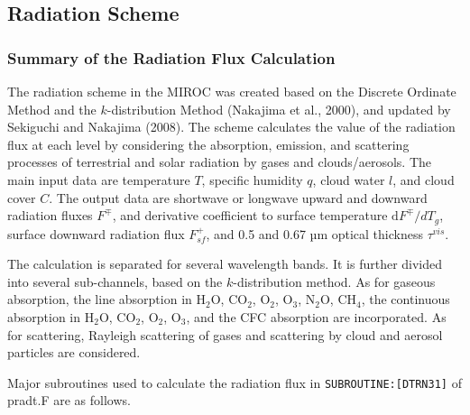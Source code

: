 \hypertarget{radiation-scheme}{%
\subsection{Radiation Scheme}\label{radiation-scheme}}

\hypertarget{summary-of-the-radiation-flux-calculation}{%
\subsubsection{Summary of the Radiation Flux
Calculation}\label{summary-of-the-radiation-flux-calculation}}

The radiation scheme in the MIROC was created based on the Discrete
Ordinate Method and the \(k\)-distribution Method (Nakajima et al.,
2000), and updated by Sekiguchi and Nakajima (2008). The scheme
calculates the value of the radiation flux at each level by considering
the absorption, emission, and scattering processes of terrestrial and
solar radiation by gases and clouds/aerosols. The main input data are
temperature \(T\), specific humidity \(q\), cloud water \(l\), and cloud
cover \(C\). The output data are shortwave or longwave upward and
downward radiation fluxes \(F^{\mp}\), and derivative coefficient to
surface temperature \(\mathrm{d}F^{\mp}/dT_{g}\), surface downward
radiation flux \(F_{sf}^{+}\), and 0.5 and 0.67 µm optical thickness
\(\tau^{vis}\).

The calculation is separated for several wavelength bands. It is further
divided into several sub-channels, based on the \(k\)-distribution
method. As for gaseous absorption, the line absorption in
\(\mathrm{H_2O}\), \(\mathrm{CO_2}\), \(\mathrm{O_2}\),
\(\mathrm{O_3}\), \(\mathrm{N_2} \mathrm{O}\), \(\mathrm{CH_4}\), the
continuous absorption in \(\mathrm{H_2} \mathrm{O}\), \(\mathrm{CO_2}\),
\(\mathrm{O_2}\), \(\mathrm{O_3}\), and the CFC absorption are
incorporated. As for scattering, Rayleigh scattering of gases and
scattering by cloud and aerosol particles are considered.

Major subroutines used to calculate the radiation flux in
\texttt{SUBROUTINE:{[}DTRN31{]}} of pradt.F are as follows.

